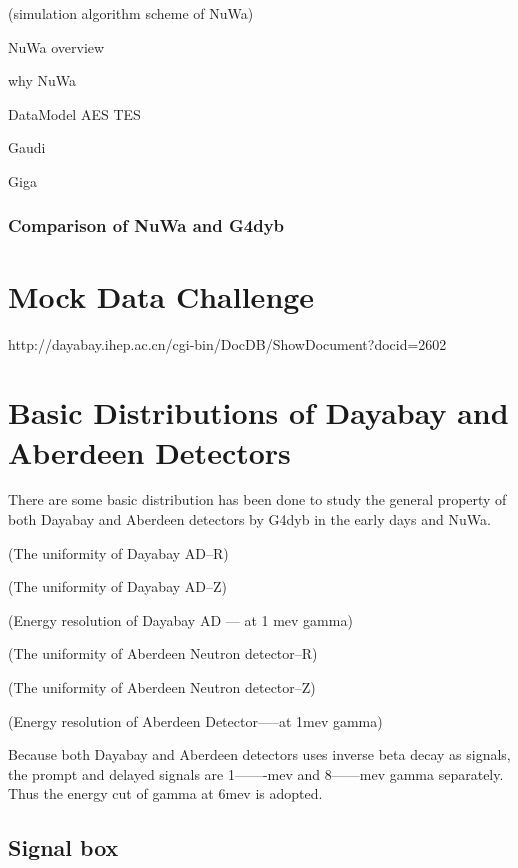 (simulation algorithm scheme of NuWa)





NuWa overview

why NuWa

DataModel AES TES

Gaudi

Giga


\subsubsection {Comparison of NuWa and G4dyb}





\section {Mock Data Challenge}

http://dayabay.ihep.ac.cn/cgi-bin/DocDB/ShowDocument?docid=2602


\section {Basic Distributions of Dayabay and Aberdeen Detectors}

There are some basic distribution has been done to study the general
property of both Dayabay and Aberdeen detectors by G4dyb in the early
days and NuWa.


(The uniformity of Dayabay AD--R)




(The uniformity of Dayabay AD--Z)




(Energy resolution of Dayabay AD --- at 1 mev gamma)




(The uniformity of Aberdeen Neutron detector--R)




(The uniformity of Aberdeen Neutron detector--Z)




(Energy resolution of Aberdeen Detector-----at 1mev gamma)


Because both Dayabay and Aberdeen detectors uses inverse
beta decay as signals, the prompt and delayed signals are
1-------mev and 8------mev gamma separately. Thus
the energy cut of gamma at 6mev is adopted.


\subsection {Signal box}

